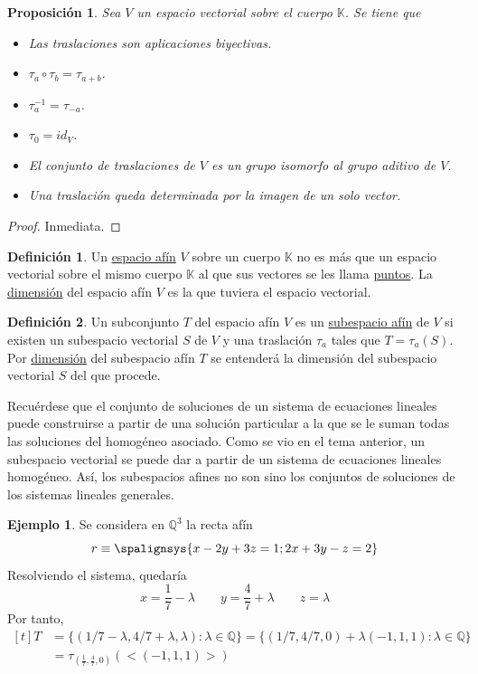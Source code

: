 \documentclass[12pt]{report}
\newtheorem{proposition}{Proposición}[chapter]
\theoremstyle{definition}
\newtheorem{definition}{Definición}[chapter]
\theoremstyle{definition}
\newtheorem{example}{Ejemplo}[chapter]
\theoremstyle{remark}
\newcommand{\Q}{\mathbb Q}
\begin{document}
\begin{proposition}
Sea $V$ un espacio vectorial sobre el cuerpo $\mathbb{K}$. Se tiene que
\begin{itemize}
    \item[(i)] Las traslaciones son aplicaciones biyectivas.
    \item[(ii)] $\tau_a \circ \tau_b = \tau_{a+b}$.
    \item[(iii)] $\tau_a^{-1} = \tau_{-a}$.
    \item[(iv)] $\tau_0 = id_V$.
    \item[(v)] El conjunto de traslaciones de $V$ es un grupo isomorfo al grupo aditivo de $V$.
    \item[(vi)] Una traslación queda determinada por la imagen de un solo vector.
\end{itemize}
\end{proposition}

\begin{proof}
Inmediata.
\end{proof}

\begin{definition}
Un \ul{espacio afín} $V$ sobre un cuerpo $\mathbb{K}$ no es más que un espacio vectorial sobre el mismo cuerpo $\mathbb{K}$ al que sus vectores se les llama \ul{puntos}. La \ul{dimensión} del espacio afín $V$ es la que tuviera el espacio vectorial.
\end{definition}

\begin{definition} Un subconjunto $T$ del espacio afín $V$ es un \ul{subespacio afín} de $V$ si existen un subespacio vectorial $S$ de $V$ y una traslación $\tau_a$ tales que $T = \tau_a(S)$. Por \ul{dimensión} del subespacio afín $T$ se entenderá la dimensión del subespacio vectorial $S$ del que procede.
\end{definition}

Recuérdese que el conjunto de soluciones de un sistema de ecuaciones lineales puede construirse a partir de una
solución particular a la que se le suman todas las soluciones del homogéneo asociado. Como se vio en el tema anterior, un subespacio vectorial se puede dar a partir de un sistema de ecuaciones lineales homogéneo. Así, los subespacios afines no son sino los conjuntos de soluciones de los sistemas lineales generales.

\begin{example}
Se considera en $\Q^3$ la recta afín
\[r \equiv 
\spalignsys{
x - 2y + 3z = 1 ;
2x + 3y - z = 2
}
\]
Resolviendo el sistema, quedaría
\[ x = \frac{1}{7}-\lambda \qquad y = \frac{4}{7}+\lambda \qquad z = \lambda\]
Por tanto,
\[
\begin{aligned}[t]
T &= \{(1/7-\lambda,4/7+\lambda,\lambda) \colon \lambda \in \Q\} = \{(1/7,4/7,0)+\lambda (-1,1,1) \colon \lambda \in \Q\} \\
&= \tau_{(\frac{1}{7},\frac{4}{7},0)}(<(-1,1,1)>)
\end{aligned}
\]
\end{example}
\end{document}
